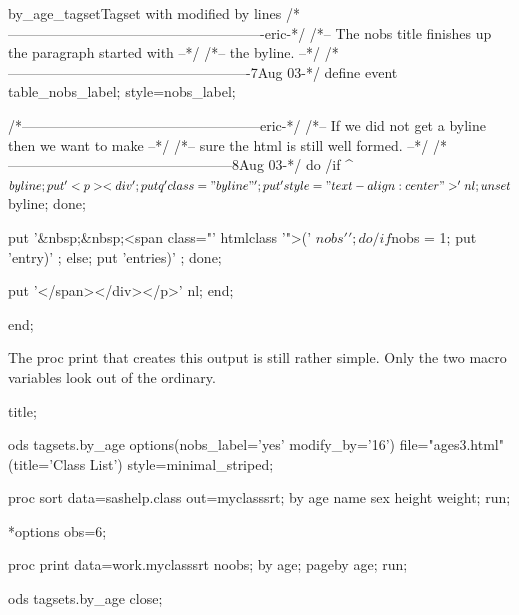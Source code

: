 \begin{fvcode}{by_age_tagset}{Tagset with modified by lines}
        /*-------------------------------------------------------eric-*/
        /*-- The nobs title finishes up the paragraph started with  --*/
        /*-- the byline.                                            --*/
        /*----------------------------------------------------7Aug 03-*/
        define event table_nobs_label;
            style=nobs_label;

            /*---------------------------------------------------eric-*/
            /*-- If we did not get a byline then we want to make    --*/
            /*-- sure the html is still well formed.                --*/
            /*------------------------------------------------8Aug 03-*/
            do /if ^$byline;
                put '<p><div';
                putq ' class="byline"';
                put ' style="text-align: center">' nl;
                unset $byline;
            done;

            put '&nbsp;&nbsp;<span class="' htmlclass '">(' $nobs ' ';

            do /if $nobs = 1; 
                put 'entry)' ;
            else;
                put 'entries)' ;
            done;

            put '</span></div></p>' nl;
        end;

    end;
\end{fvcode}

The proc print that creates this output is still rather simple.  Only the two
macro variables look out of the ordinary.

\begin{sfvcode}
title;

ods tagsets.by_age options(nobs_label='yes' modify_by='16')
    file="ages3.html" (title='Class List')
    style=minimal_striped;

proc sort data=sashelp.class out=myclasssrt;
  by age name sex height weight;
run;

*options obs=6;

proc print data=work.myclasssrt noobs;
    by age;
    pageby age;
run;

ods tagsets.by_age close;
\end{sfvcode}


